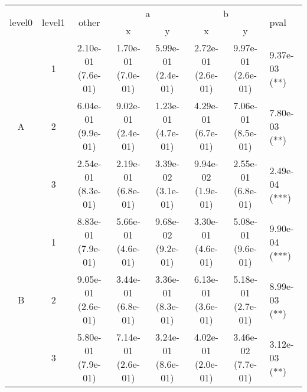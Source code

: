 \begin{tabular}{cccccccl}
\toprule
\multirow{2}{*}{level0} & \multirow{2}{*}{level1}& \multirow{2}{*}{other}&\multicolumn{2}{c}{a}&\multicolumn{2}{c}{b}& \multirow{2}{*}{pval}\tabularnewline
\cmidrule(lr){4-5}
\cmidrule(lr){6-7}
&&&x&y&x&y\tabularnewline
\midrule
\multirow{3}{*}{A}&1& 2.10e-01 (7.6e-01)& 1.70e-01 (7.0e-01)& 5.99e-01 (2.4e-01)& 2.72e-01 (2.6e-01)& 9.97e-01 (2.6e-01)& 9.37e-03 (**)\tabularnewline
&2& 6.04e-01 (9.9e-01)& 9.02e-01 (2.4e-01)& 1.23e-01 (4.7e-01)& 4.29e-01 (6.7e-01)& 7.06e-01 (8.5e-01)& 7.80e-03 (**)\tabularnewline
&3& 2.54e-01 (8.3e-01)& 2.19e-01 (6.8e-01)& 3.39e-02 (3.1e-01)& 9.94e-02 (1.9e-01)& 2.55e-01 (6.8e-01)& 2.49e-04 (***)\tabularnewline
\midrule
\multirow{3}{*}{B}&1& 8.83e-01 (7.9e-01)& 5.66e-01 (4.6e-01)& 9.68e-02 (9.2e-01)& 3.30e-01 (4.6e-01)& 5.08e-01 (9.6e-01)& 9.90e-04 (***)\tabularnewline
&2& 9.05e-01 (2.6e-01)& 3.44e-01 (6.8e-01)& 3.36e-01 (8.3e-01)& 6.13e-01 (3.6e-01)& 5.18e-01 (2.7e-01)& 8.99e-03 (**)\tabularnewline
&3& 5.80e-01 (7.9e-01)& 7.14e-01 (2.6e-01)& 3.24e-01 (8.6e-01)& 4.02e-01 (2.0e-01)& 3.46e-02 (7.7e-01)& 3.12e-03 (**)\tabularnewline
\bottomrule
\end{tabular}
